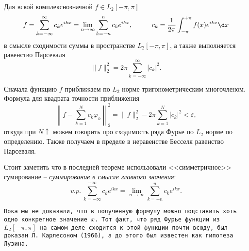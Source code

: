 


\begin{to_thr}
    Для вской комплекснозначной $f \in L_2 [-\pi, \pi]$
    \begin{equation*}
        f = \sum_{k=-\infty}^{\infty} 
        c_k e^{ikx} = 
        \lim_{n \to \infty} \sum_{k=-n}^{n} c_k e^{ikx},
        \hspace{10 mm} 
        c_k = \frac{1}{2\pi} \int_{-\pi}^{+\pi} f(x) e^{ikx} \d x
    \end{equation*}
    в смысле сходимости суммы в пространстве $L_2[-\pi, \pi]$, а также выполняется равенство Парсеваля
    \begin{equation*}
        \|f\|_2^2 = 2 \pi \sum_{k=-\infty}^{\infty} |c_k|^2.
    \end{equation*}
\end{to_thr}

\begin{uproof}
    Сначала функцию $f$ приближаем по $L_2$ норме тригонометрическим многочленом. Формула для квадрата точности приближения
    \begin{equation*}
         \left\|
            f - \sum_{k=1}^{N} c_k \varphi_k
         \right\|_2^2 = \|f\|_2^2 - 2\pi \sum_{k=1}^{N} |c_k|^2 < \varepsilon,
     \end{equation*} 
     откуда при $N \uparrow$ можем говорить про сходимость ряда Фурье по $L_2$ норме по определению. Также получаем в пределе в неравенстве Бесселя равенство Парсеваля. 
\end{uproof}

Стоит заметить что в последней теореме использовали <<симметричное>> сумирование -- \textit{суммирование в смысле главного значения}:
\begin{equation*}
    v.p. \ \sum_{k=-\infty}^{+\infty} c_k e^{ikx}  = \lim_{n \to \infty} \sum_{k=-n}^{n}  c_k e^{ikx}.
\end{equation*}

\texttt{Пока мы не доказали, что в полученную формулу можно подставить хоть одно конкретное значение $x$. Тот факт, что ряд Фурье функции из
$L_2[-\pi, \pi]$ на самом деле сходится к этой функции почти всюду, был доказан Л. Карлесоном (1966), а до этого был известен как гипотеза Лузина.} 

